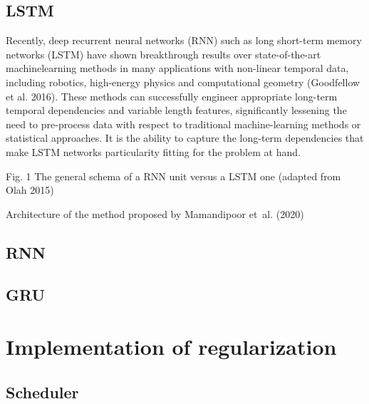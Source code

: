 \subsection{LSTM}
Recently, deep recurrent neural networks (RNN) such as long short-term memory networks (LSTM) have shown breakthrough results over state-of-the-art machinelearning methods in many applications with non-linear temporal data, including robotics, high-energy physics and computational geometry (Goodfellow et al. 2016). These methods can successfully engineer appropriate long-term temporal dependencies and variable length features, significantly lessening the need to pre-process data with respect to traditional machine-learning methods or statistical approaches. It is the ability to capture the long-term dependencies that make LSTM networks particularity fitting for the problem at hand. 

Fig. 1 The general schema of a RNN unit versus a LSTM one (adapted from Olah 2015)

Architecture of the method proposed by Mamandipoor et al. (2020)

\subsection{RNN}

\subsection{GRU}

\section{Implementation of regularization}

\subsection{Scheduler}


